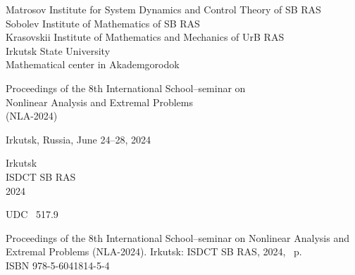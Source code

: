 \documentclass[12pt,final]{llncs}
\begin{document}
%
%
\frontmatter          %
\setcounter{page}{1}
%
%

\begin{center}
{\bf
  \thispagestyle{empty}
  \pagestyle{fancy}

   	Matrosov Institute for System Dynamics and Control Theory of  SB RAS\\[0.3em]

 	Sobolev Institute of Mathematics  of SB RAS\\[0.3em]

  Krasovskii Institute of Mathematics and Mechanics of UrB RAS\\[0.3em]

 	Irkutsk State University\\[0.3em]
 	Mathematical center in Akademgorodok
 	  }


\vfill

{  \Large Proceedings of the 8th International School--seminar on\\[0.3em]

Nonlinear Analysis and Extremal Problems\\[0.3em]

  (NLA-2024)\\[0.2em] }

{\Large  Irkutsk, Russia, June 24--28, 2024 }

\vfill
\vfill



Irkutsk\\
ISDCT SB RAS\\
2024

\end{center}

\newpage

\thispagestyle{empty}
\noindent{}UDC \ 517.9

 \vspace{3cm}

Proceedings of the 8th International School--seminar on Nonlinear
Analysis and Extremal Problems  (NLA-2024). Irkutsk\;:
ISDCT SB RAS, 2024, \pageref{LastPage}~p.\\
ISBN 978-5-6041814-5-4

 \vspace{1cm}
\end{document}
